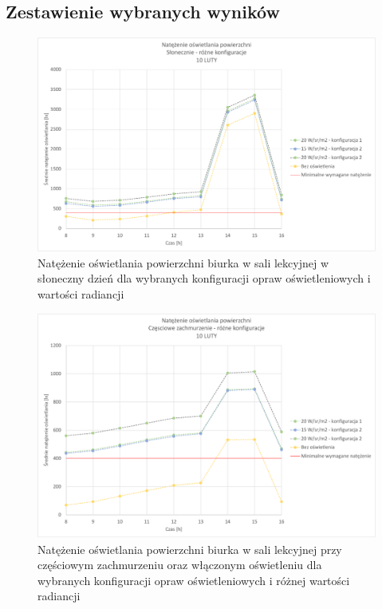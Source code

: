 \documentclass[a4paper,12pt]{article}
\begin{document}
	\subsection{Zestawienie wybranych wyników}
	\label{subsec:zestawienie_wybranych_wynikow}
	
	\begin{figure}[!ht]
		\centering
		\includegraphics[scale=0.8]{Wykresy/oswietlenie_slonecznie_rozne_konfiguracje.pdf}
		\caption{Natężenie oświetlania powierzchni biurka w sali lekcyjnej w słoneczny dzień dla wybranych konfiguracji opraw oświetleniowych i wartości radiancji}
		\label{oswietlenie_slonecznie_rozne_konfiguracje}
	\end{figure}

	\begin{figure}[!ht]
		\centering
		\includegraphics[scale=0.8]{Wykresy/oswietlenie_czesciowe_zachmurzenie_rozne_konfiguracje.pdf}
		\caption{Natężenie oświetlania powierzchni biurka w sali lekcyjnej przy częściowym zachmurzeniu  oraz włączonym oświetleniu dla wybranych konfiguracji opraw oświetleniowych i różnej wartości radiancji}
		\label{oswietlenie_czesciowe_zachmurzenie_rozne_konfiguracje}
	\end{figure}
\end{document}
